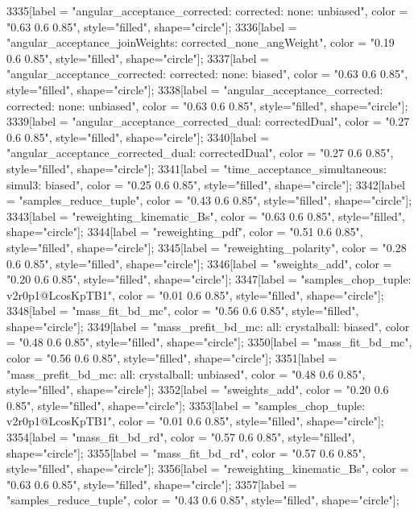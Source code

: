 {	3335[label = "angular_acceptance_corrected\nangacc: corrected\ncsp: none\ntrigger: unbiased", color = "0.63 0.6 0.85", style="filled", shape="circle"];
	3336[label = "angular_acceptance_joinWeights\nwflag: corrected_none_angWeight", color = "0.19 0.6 0.85", style="filled", shape="circle"];
	3337[label = "angular_acceptance_corrected\nangacc: corrected\ncsp: none\ntrigger: biased", color = "0.63 0.6 0.85", style="filled", shape="circle"];
	3338[label = "angular_acceptance_corrected\nangacc: corrected\ncsp: none\ntrigger: unbiased", color = "0.63 0.6 0.85", style="filled", shape="circle"];
	3339[label = "angular_acceptance_corrected_dual\nstep: correctedDual", color = "0.27 0.6 0.85", style="filled", shape="circle"];
	3340[label = "angular_acceptance_corrected_dual\nstep: correctedDual", color = "0.27 0.6 0.85", style="filled", shape="circle"];
	3341[label = "time_acceptance_simultaneous\ntimeacc: simul3\ntrigger: biased", color = "0.25 0.6 0.85", style="filled", shape="circle"];
	3342[label = "samples_reduce_tuple", color = "0.43 0.6 0.85", style="filled", shape="circle"];
	3343[label = "reweighting_kinematic_Bs", color = "0.63 0.6 0.85", style="filled", shape="circle"];
	3344[label = "reweighting_pdf", color = "0.51 0.6 0.85", style="filled", shape="circle"];
	3345[label = "reweighting_polarity", color = "0.28 0.6 0.85", style="filled", shape="circle"];
	3346[label = "sweights_add", color = "0.20 0.6 0.85", style="filled", shape="circle"];
	3347[label = "samples_chop_tuple\nversion: v2r0p1@LcosKpTB1", color = "0.01 0.6 0.85", style="filled", shape="circle"];
	3348[label = "mass_fit_bd_mc", color = "0.56 0.6 0.85", style="filled", shape="circle"];
	3349[label = "mass_prefit_bd_mc\nmassbin: all\nmassmodel: crystalball\ntrigger: biased", color = "0.48 0.6 0.85", style="filled", shape="circle"];
	3350[label = "mass_fit_bd_mc", color = "0.56 0.6 0.85", style="filled", shape="circle"];
	3351[label = "mass_prefit_bd_mc\nmassbin: all\nmassmodel: crystalball\ntrigger: unbiased", color = "0.48 0.6 0.85", style="filled", shape="circle"];
	3352[label = "sweights_add", color = "0.20 0.6 0.85", style="filled", shape="circle"];
	3353[label = "samples_chop_tuple\nversion: v2r0p1@LcosKpTB1", color = "0.01 0.6 0.85", style="filled", shape="circle"];
	3354[label = "mass_fit_bd_rd", color = "0.57 0.6 0.85", style="filled", shape="circle"];
	3355[label = "mass_fit_bd_rd", color = "0.57 0.6 0.85", style="filled", shape="circle"];
	3356[label = "reweighting_kinematic_Bs", color = "0.63 0.6 0.85", style="filled", shape="circle"];
	3357[label = "samples_reduce_tuple", color = "0.43 0.6 0.85", style="filled", shape="circle"];
}
